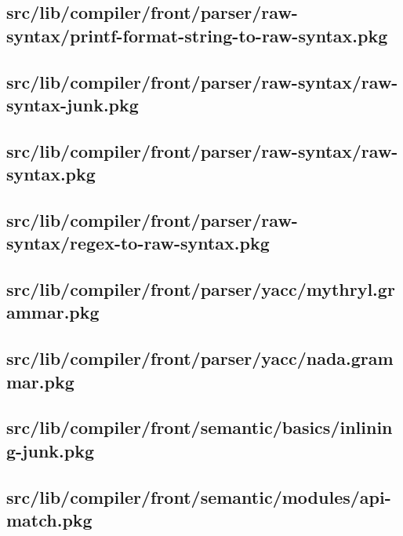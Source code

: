 \subsection{src/lib/compiler/front/parser/raw-syntax/printf-format-string-to-raw-syntax.pkg}


\subsection{src/lib/compiler/front/parser/raw-syntax/raw-syntax-junk.pkg}


\subsection{src/lib/compiler/front/parser/raw-syntax/raw-syntax.pkg}


\subsection{src/lib/compiler/front/parser/raw-syntax/regex-to-raw-syntax.pkg}


\subsection{src/lib/compiler/front/parser/yacc/mythryl.grammar.pkg}


\subsection{src/lib/compiler/front/parser/yacc/nada.grammar.pkg}


\subsection{src/lib/compiler/front/semantic/basics/inlining-junk.pkg}


\subsection{src/lib/compiler/front/semantic/modules/api-match.pkg}


